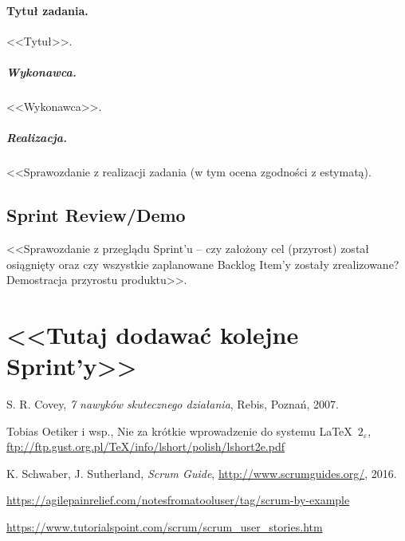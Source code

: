 \documentclass[a4paper]{article}
\begin{document}
\paragraph{Tytuł zadania.} <<Tytuł>>.
\subparagraph{Wykonawca.} <<Wykonawca>>.
\subparagraph{Realizacja.} <<Sprawozdanie z realizacji zadania (w tym ocena zgodności z estymatą).


\subsection{Sprint Review/Demo}
<<Sprawozdanie z przeglądu Sprint'u -- czy założony cel (przyrost) został osiągnięty oraz czy wszystkie zaplanowane Backlog Item'y zostały zrealizowane? Demostracja przyrostu produktu>>.

\section*{<<Tutaj dodawać kolejne Sprint'y>>}


\begin{thebibliography}{9}

 S. R. Covey, {\em 7 nawyków skutecznego działania}, Rebis, Poznań, 2007.

 Tobias Oetiker i wsp., Nie za krótkie wprowadzenie do systemu \LaTeX  \ $2_\varepsilon$, \url{ftp://ftp.gust.org.pl/TeX/info/lshort/polish/lshort2e.pdf}

 K. Schwaber, J. Sutherland, {\em Scrum Guide}, \url{http://www.scrumguides.org/}, 2016.

 \url{https://agilepainrelief.com/notesfromatooluser/tag/scrum-by-example}

 \url{https://www.tutorialspoint.com/scrum/scrum_user_stories.htm}

\end{thebibliography}
\end{document}
